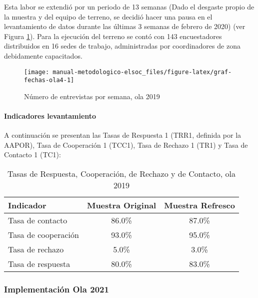 \documentclass[
  12pt,
]{article}
\begin{document}
Esta labor se extendió por un periodo de 13 semanas (Dado el desgaste propio de la muestra y del equipo de terreno, se decidió hacer una pausa en el levantamiento de datos durante las últimas 3 semanas de febrero de 2020) (ver Figura \ref{fig:graf-fechas-ola4}). Para la ejecución del terreno se contó con 143 encuestadores distribuidos en 16 sedes de trabajo, administradas por coordinadores de zona debidamente capacitados.

\begin{figure}

{\centering \texttt{[image: manual-metodologico-elsoc\_files/figure-latex/graf-fechas-ola4-1]} 

}

\caption{Número de entrevistas por semana, ola 2019}\label{fig:graf-fechas-ola4}
\end{figure}

\hypertarget{indicadores-levantamiento-3}{%
\paragraph*{Indicadores levantamiento}\label{indicadores-levantamiento-3}}

A continuación se presentan las Tasas de Respuesta 1 (TRR1, definida por la AAPOR), Tasa de Cooperación 1 (TCC1), Tasa de Rechazo 1 (TR1) y Tasa de Contacto 1 (TC1):

\begin{table}[H]

\caption{\label{tab:tabla-tasas-ola4}Tasas de Respuesta, Cooperación, de Rechazo y de Contacto, ola 2019}
\centering
\begin{tabular}[t]{lcc}
\toprule
Indicador & Muestra Original & Muestra Refresco\\
\midrule
Tasa de contacto & 86.0\% & 87.0\%\\
Tasa de cooperación & 93.0\% & 95.0\%\\
Tasa de rechazo & 5.0\% & 3.0\%\\
Tasa de respuesta & 80.0\% & 83.0\%\\
\bottomrule
\end{tabular}
\end{table}

\hypertarget{implementaciuxf3n-ola-2021}{%
\subsubsection{Implementación Ola 2021}\label{implementaciuxf3n-ola-2021}}
\end{document}
